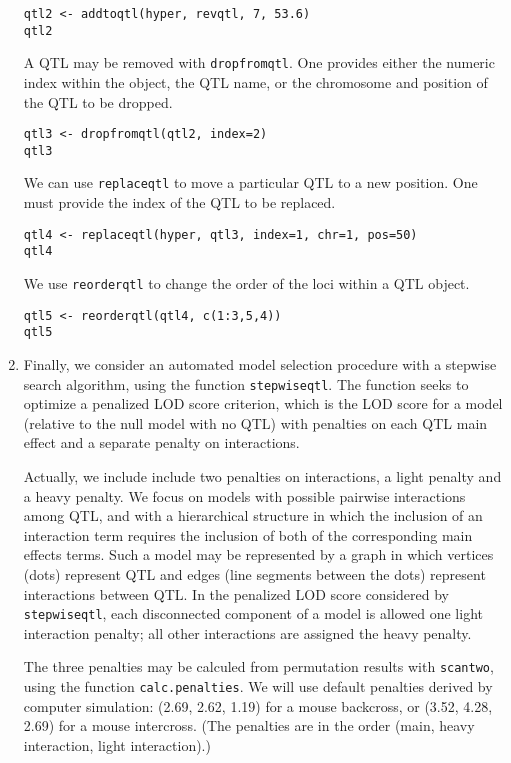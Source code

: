 \documentclass[10pt,letterpaper]{article}
\newcommand{\usercolor}{\color [named]{BlueViolet}}
\begin{document}
\begin{enumerate}
\usercolor
\verb|qtl2 <- addtoqtl(hyper, revqtl, 7, 53.6)| \\
\verb|qtl2|
\normalcolor

  A QTL may be removed with \verb-dropfromqtl-.  One provides either
  the numeric index within the object, the QTL name, or the chromosome and
  position of the QTL to be dropped.

\usercolor
\verb|qtl3 <- dropfromqtl(qtl2, index=2)| \\
\verb|qtl3|
\normalcolor

  We can use \verb-replaceqtl- to move a particular QTL to a new
  position.  One must provide the index of the QTL to be replaced.

\usercolor
\verb|qtl4 <- replaceqtl(hyper, qtl3, index=1, chr=1, pos=50)| \\
\verb|qtl4|
\normalcolor

  We use \verb-reorderqtl- to change the order of the loci within a
  QTL object.

\usercolor
\verb|qtl5 <- reorderqtl(qtl4, c(1:3,5,4))| \\
\verb|qtl5|
\normalcolor

\item Finally, we consider an automated model selection procedure with
  a stepwise search algorithm, using the function \verb-stepwiseqtl-.
  The function seeks to optimize a penalized LOD score criterion,
  which is the LOD score for a model (relative to the null model with
  no QTL) with penalties on each QTL main effect and a separate
  penalty on interactions.  

  Actually, we include include two penalties on interactions, a light
  penalty and a heavy penalty.  We focus on models with possible
  pairwise interactions among QTL, and with a hierarchical
  structure in which the inclusion of an interaction term requires
  the inclusion of both of the corresponding main effects terms.  Such
  a model may be represented by a graph in which vertices (dots)
  represent QTL and edges (line segments between the dots) represent
  interactions between QTL.  In the penalized LOD score considered by
  \verb-stepwiseqtl-, each disconnected component of a model is
  allowed one light interaction penalty; all other interactions are
  assigned the heavy penalty.  

  The three penalties may be calculed from permutation results with
  \verb-scantwo-, using the function \verb-calc.penalties-.  We will
  use default penalties derived by computer simulation: (2.69, 2.62,
  1.19) for a mouse backcross, or (3.52, 4.28, 2.69) for a mouse
  intercross.  (The penalties are in the order (main, heavy
  interaction, light interaction).)


\end{enumerate}
\end{document}
